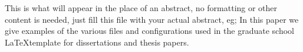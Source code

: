 This is what will appear in the place of an abstract, no formatting or other content is needed, just fill this file with your actual abstract, eg; In this paper we give examples of the various files and configurations used in the graduate school \LaTeX template for dissertations and thesis papers.
